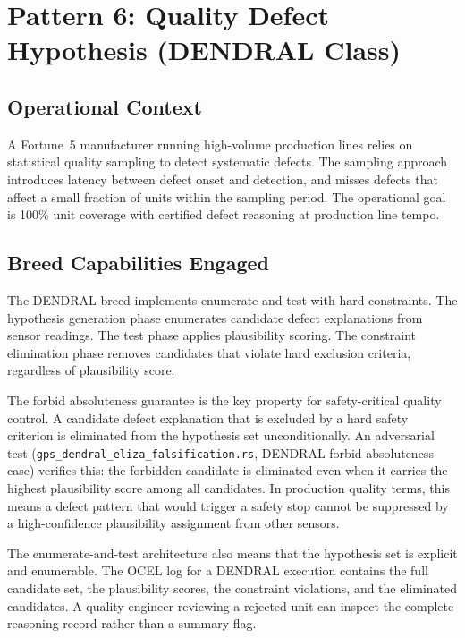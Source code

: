 \section{Pattern 6: Quality Defect Hypothesis (DENDRAL Class)}
\label{sec:dendral-deployment}

\subsection*{Operational Context}

A Fortune~5 manufacturer running high-volume production lines relies on statistical
quality sampling to detect systematic defects. The sampling approach introduces
latency between defect onset and detection, and misses defects that affect a small
fraction of units within the sampling period. The operational goal is 100\% unit
coverage with certified defect reasoning at production line tempo.

\subsection*{Breed Capabilities Engaged}

The DENDRAL breed implements enumerate-and-test with hard constraints. The
hypothesis generation phase enumerates candidate defect explanations from sensor
readings. The test phase applies plausibility scoring. The constraint elimination
phase removes candidates that violate hard exclusion criteria, regardless of
plausibility score.

The forbid absoluteness guarantee is the key property for safety-critical quality
control. A candidate defect explanation that is excluded by a hard safety criterion
is eliminated from the hypothesis set unconditionally. An adversarial test
(\texttt{gps\_dendral\_eliza\_falsification.rs}, DENDRAL forbid absoluteness case)
verifies this: the forbidden candidate is eliminated even when it carries the
highest plausibility score among all candidates. In production quality terms, this
means a defect pattern that would trigger a safety stop cannot be suppressed by
a high-confidence plausibility assignment from other sensors.

The enumerate-and-test architecture also means that the hypothesis set is explicit
and enumerable. The OCEL log for a DENDRAL execution contains the full candidate
set, the plausibility scores, the constraint violations, and the eliminated
candidates. A quality engineer reviewing a rejected unit can inspect the complete
reasoning record rather than a summary flag.

